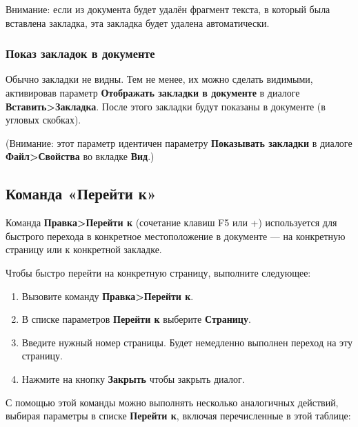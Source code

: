 ﻿\documentclass[a4paper,10pt]{article}
\begin{document}
Внимание: если из документа будет удалён фрагмент текста, в который была вставлена закладка, эта закладка будет удалена автоматически.

\subsubsection{Показ закладок в документе}
Обычно закладки не видны. Тем не менее, их можно сделать видимыми, активировав параметр \textbf{Отображать закладки в документе} в диалоге \textbf{Вставить>Закладка}. После этого закладки будут показаны в документе (в угловых скобках).

(Внимание: этот параметр идентичен параметру \textbf{Показывать закладки} в диалоге \textbf{Файл>Свойства} во вкладке \textbf{Вид}.)

\subsection{Команда «Перейти к»}
Команда \textbf{Правка>Перейти к} (сочетание клавиш F5 или +) используется для быстрого перехода в конкретное местоположение в документе — на конкретную страницу или к конкретной закладке.

Чтобы быстро перейти на конкретную страницу, выполните следующее:
\begin{enumerate}
 \item Вызовите команду \textbf{Правка>Перейти к}.
 \item В списке параметров \textbf{Перейти к} выберите \textbf{Страницу}.
 \item Введите нужный номер страницы. Будет немедленно выполнен переход на эту страницу.
 \item Нажмите на кнопку \textbf{Закрыть} чтобы закрыть диалог.
\end{enumerate}

С помощью этой команды можно выполнять несколько аналогичных действий, выбирая параметры в списке \textbf{Перейти к}, включая перечисленные в этой таблице:
\end{document}
